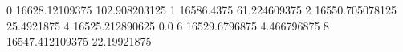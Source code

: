 0 16628.12109375 102.908203125
1 16586.4375 61.224609375
2 16550.705078125 25.4921875
4 16525.212890625 0.0
6 16529.6796875 4.466796875
8 16547.412109375 22.19921875
